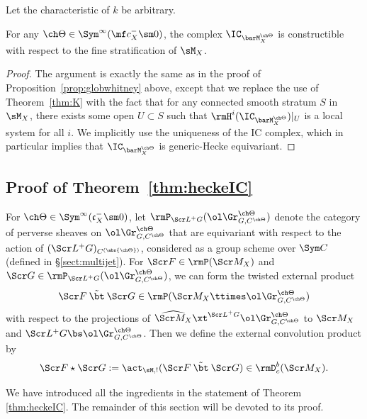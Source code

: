 Let the characteristic of $k$ be arbitrary.

\begin{prop}
\notready \label{prop:Whitney-poschar}
For any $\ch\Theta \in \Sym^\infty(\mf c_X^-\sm 0)$,
the complex $\IC_{\barM^{\ch\Theta}_X}$
is constructible with respect to the fine stratification of $\sM_X$.
\end{prop}

\begin{proof}
The argument is exactly the same as in the proof of Proposition~\ref{prop:globwhitney}
above, except that we replace the use of Theorem~\ref{thm:K} with
the fact that for any connected smooth stratum $S$ in $\sM_X$,
there exists some open $U\subset S$ such that
$\rmH^i(\IC_{\barM^{\ch\Theta}_X})|_U$ is a local system for all $i$.
We implicitly use the uniqueness of the IC complex, which in
particular implies that $\IC_{\barM^{\ch\Theta}_X}$ is generic-Hecke equivariant.
\end{proof}


\subsection{Proof of Theorem~\ref{thm:heckeIC}} \label{sect:pf:heckeIC}

For $\ch\Theta \in \Sym^\infty(\mathfrak c_X^-\sm 0)$,
let $\rmP_{\Scr L^+ G}(\ol\Gr^{\ch\Theta}_{G,C^{\ch\Theta}})$ denote the
category of perverse sheaves on $\ol\Gr^{\ch\Theta}_{G,C^{\ch\Theta}}$ that
are equivariant with respect to the action of $(\Scr L^+ G)_{C^{(\abs{\ch\Theta})}}$,
considered as a group scheme over $\Sym C$
(defined in \S\ref{sect:multijet}).
For $\Scr F \in \rmP(\Scr M_X)$ and
$\Scr G \in \rmP_{\Scr L^+G}(\ol\Gr^{\ch\Theta}_{G,C^{\ch\Theta}})$, we
can form the twisted external product
\[ \Scr F \mathbin{\tilde\bt} \Scr G \in \rmP(\Scr M_X \ttimes \ol\Gr^{\ch\Theta}_{G,C^{\ch\Theta}}) \]
with respect to the projections of
$\widehat{\Scr M_X} \xt^{\Scr L^+G} \ol\Gr^{\ch\Theta}_{G,C^{\ch\Theta}}$ to
$\Scr M_X$ and $\Scr L^+G \bs \ol\Gr^{\ch\Theta}_{G,C^{\ch\Theta}}$.
Then we define the external convolution product by
\[ \Scr F \star \Scr G := \act_{\sM,!}( \Scr F \mathbin{\tilde\bt} \Scr G ) \in \rmD^b_c(\Scr M_X). \]

We have introduced all the ingredients in the statement of Theorem \ref{thm:heckeIC}. The remainder of this section will be devoted to its proof.




